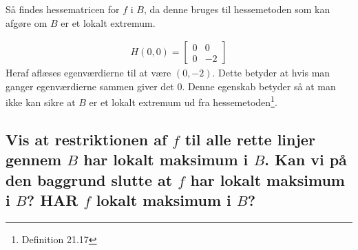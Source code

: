 Så findes hessematricen for $f$ i $B$, da denne bruges til hessemetoden som kan afgøre om $B$ er et lokalt extremum.

\begin{align}
    H(0,0) = 
    \left[
        \begin{array}{cc}
            0 & 0\\0 & -2
        \end{array}
    \right] 
\end{align}
Heraf aflæses egenværdierne til at være $(0,-2)$.
Dette betyder at hvis man ganger egenværdierne sammen giver det 0. Denne egenskab betyder så at man ikke kan sikre at $B$ er et lokalt extremum ud fra hessemetoden\footnote{Definition 21.17}.



\subsection{Vis at restriktionen af $f$ til alle rette linjer gennem $B$ har lokalt maksimum i $B$. Kan vi på den baggrund slutte at $f$ har lokalt maksimum i $B$? HAR $f$ lokalt maksimum i $B$?}




